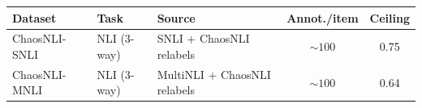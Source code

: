 \begin{tabular}{@{}l l l c c@{}}
\toprule
Dataset & Task & Source & Annot./item & Ceiling \\
\midrule
ChaosNLI-SNLI & NLI (3-way) & SNLI + ChaosNLI relabels & ${\sim}100$ & 0.75 \\
ChaosNLI-MNLI & NLI (3-way) & MultiNLI + ChaosNLI relabels & ${\sim}100$ & 0.64 \\
\bottomrule
\end{tabular}
